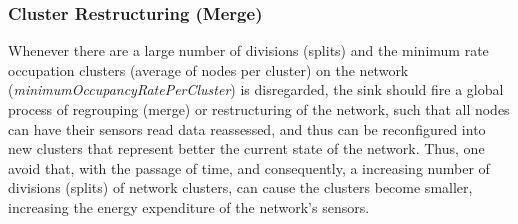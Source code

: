 \documentclass[conference]{IEEEtran}
\begin{document}
\subsubsection{Cluster Restructuring (Merge)}

Whenever there are a large number of divisions (splits) and the minimum rate
occupation clusters (average of nodes per cluster) on the network
(\textit{minimumOccupancyRatePerCluster}) is disregarded, the sink should fire a
global process of regrouping (merge) or restructuring of the network, such that
all nodes can have their sensors read data reassessed, and thus can be
reconfigured into new clusters that represent better the current state of the
network. Thus, one avoid that, with the passage of time, and consequently, a
increasing number of divisions (splits) of network clusters, can cause the
clusters become smaller, increasing the energy expenditure of the network's
sensors.

% 
\end{document}
